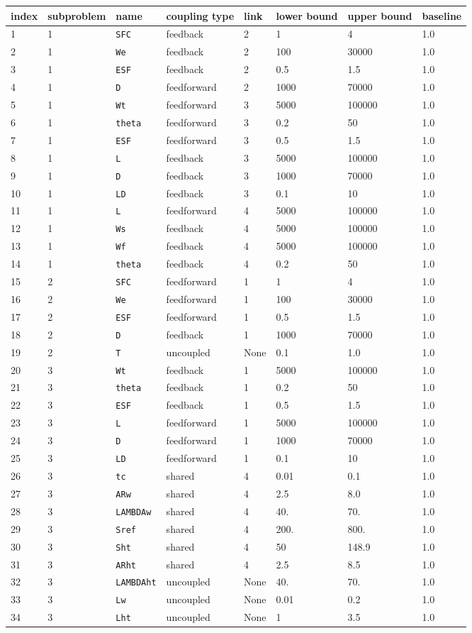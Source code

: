 \documentclass[11pt]{article}
\begin{document}
\begin{longtable}[]{@{}llllllll@{}}
\toprule
index & subproblem & name & coupling type & link & lower bound & upper
bound & baseline\tabularnewline
\midrule
\endhead
1 & 1 & \texttt{SFC} & feedback & 2 & 1 & 4 & 1.0\tabularnewline
2 & 1 & \texttt{We} & feedback & 2 & 100 & 30000 & 1.0\tabularnewline
3 & 1 & \texttt{ESF} & feedback & 2 & 0.5 & 1.5 & 1.0\tabularnewline
4 & 1 & \texttt{D} & feedforward & 2 & 1000 & 70000 & 1.0\tabularnewline
5 & 1 & \texttt{Wt} & feedforward & 3 & 5000 & 100000 &
1.0\tabularnewline
6 & 1 & \texttt{theta} & feedforward & 3 & 0.2 & 50 & 1.0\tabularnewline
7 & 1 & \texttt{ESF} & feedforward & 3 & 0.5 & 1.5 & 1.0\tabularnewline
8 & 1 & \texttt{L} & feedback & 3 & 5000 & 100000 & 1.0\tabularnewline
9 & 1 & \texttt{D} & feedback & 3 & 1000 & 70000 & 1.0\tabularnewline
10 & 1 & \texttt{LD} & feedback & 3 & 0.1 & 10 & 1.0\tabularnewline
11 & 1 & \texttt{L} & feedforward & 4 & 5000 & 100000 &
1.0\tabularnewline
12 & 1 & \texttt{Ws} & feedback & 4 & 5000 & 100000 & 1.0\tabularnewline
13 & 1 & \texttt{Wf} & feedback & 4 & 5000 & 100000 & 1.0\tabularnewline
14 & 1 & \texttt{theta} & feedback & 4 & 0.2 & 50 & 1.0\tabularnewline
15 & 2 & \texttt{SFC} & feedforward & 1 & 1 & 4 & 1.0\tabularnewline
16 & 2 & \texttt{We} & feedforward & 1 & 100 & 30000 &
1.0\tabularnewline
17 & 2 & \texttt{ESF} & feedforward & 1 & 0.5 & 1.5 & 1.0\tabularnewline
18 & 2 & \texttt{D} & feedback & 1 & 1000 & 70000 & 1.0\tabularnewline
19 & 2 & \texttt{T} & uncoupled & None & 0.1 & 1.0 & 1.0\tabularnewline
20 & 3 & \texttt{Wt} & feedback & 1 & 5000 & 100000 & 1.0\tabularnewline
21 & 3 & \texttt{theta} & feedback & 1 & 0.2 & 50 & 1.0\tabularnewline
22 & 3 & \texttt{ESF} & feedback & 1 & 0.5 & 1.5 & 1.0\tabularnewline
23 & 3 & \texttt{L} & feedforward & 1 & 5000 & 100000 &
1.0\tabularnewline
24 & 3 & \texttt{D} & feedforward & 1 & 1000 & 70000 &
1.0\tabularnewline
25 & 3 & \texttt{LD} & feedforward & 1 & 0.1 & 10 & 1.0\tabularnewline
26 & 3 & \texttt{tc} & shared & 4 & 0.01 & 0.1 & 1.0\tabularnewline
27 & 3 & \texttt{ARw} & shared & 4 & 2.5 & 8.0 & 1.0\tabularnewline
28 & 3 & \texttt{LAMBDAw} & shared & 4 & 40. & 70. & 1.0\tabularnewline
29 & 3 & \texttt{Sref} & shared & 4 & 200. & 800. & 1.0\tabularnewline
30 & 3 & \texttt{Sht} & shared & 4 & 50 & 148.9 & 1.0\tabularnewline
31 & 3 & \texttt{ARht} & shared & 4 & 2.5 & 8.5 & 1.0\tabularnewline
32 & 3 & \texttt{LAMBDAht} & uncoupled & None & 40. & 70. &
1.0\tabularnewline
33 & 3 & \texttt{Lw} & uncoupled & None & 0.01 & 0.2 &
1.0\tabularnewline
34 & 3 & \texttt{Lht} & uncoupled & None & 1 & 3.5 & 1.0\tabularnewline

\end{longtable}
\end{document}
